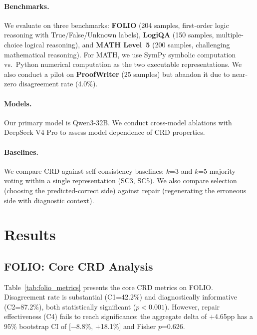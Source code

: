 \documentclass[11pt]{article}
\begin{document}
\paragraph{Benchmarks.} We evaluate on three benchmarks: \textbf{FOLIO} (204 samples, first-order logic reasoning with True/False/Unknown labels), \textbf{LogiQA} (150 samples, multiple-choice logical reasoning), and \textbf{MATH Level~5} (200 samples, challenging mathematical reasoning). For MATH, we use SymPy symbolic computation vs.\ Python numerical computation as the two executable representations. We also conduct a pilot on \textbf{ProofWriter} (25 samples) but abandon it due to near-zero disagreement rate (4.0\%).

\paragraph{Models.} Our primary model is Qwen3-32B. We conduct cross-model ablations with DeepSeek V4 Pro to assess model dependence of CRD properties.

\paragraph{Baselines.} We compare CRD against self-consistency baselines: $k$=3 and $k$=5 majority voting within a single representation (SC3, SC5). We also compare selection (choosing the predicted-correct side) against repair (regenerating the erroneous side with diagnostic context).

\section{Results}

\subsection{FOLIO: Core CRD Analysis}
\label{sec:folio}

Table~\ref{tab:folio_metrics} presents the core CRD metrics on FOLIO. Disagreement rate is substantial (C1=42.2\%) and diagnostically informative (C2=87.2\%), both statistically significant ($p < 0.001$). However, repair effectiveness (C4) fails to reach significance: the aggregate delta of $+$4.65pp has a 95\% bootstrap CI of [$-$8.8\%, $+$18.1\%] and Fisher $p$=0.626.
\end{document}
